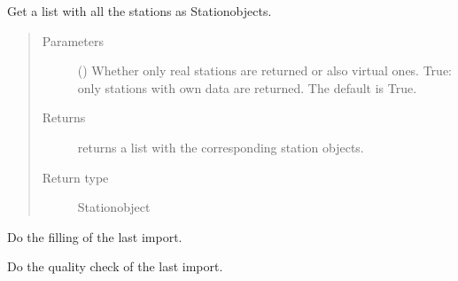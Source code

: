 \documentclass[letterpaper,10pt,english]{sphinxmanual}
\begin{document}
\begin{fulllineitems}

\begin{fulllineitems}
\label{\detokenize{weatherDB:weatherDB.stations.StationsBase.get_stations}}
\sphinxAtStartPar
Get a list with all the stations as Station\sphinxhyphen{}objects.
\begin{quote}\begin{description}
\item[{Parameters}] \leavevmode
\sphinxAtStartPar
{} (\sphinxstyleliteralemphasis{\sphinxupquote{, }}) \textendash{} Whether only real stations are returned or also virtual ones.
True: only stations with own data are returned.
The default is True.

\item[{Returns}] \leavevmode
\sphinxAtStartPar
returns a list with the corresponding station objects.

\item[{Return type}] \leavevmode
\sphinxAtStartPar
Station\sphinxhyphen{}object

\end{description}\end{quote}

\end{fulllineitems}


\begin{fulllineitems}
\label{\detokenize{weatherDB:weatherDB.stations.StationsBase.last_imp_fillup}}
\sphinxAtStartPar
Do the filling of the last import.

\end{fulllineitems}


\begin{fulllineitems}
\label{\detokenize{weatherDB:weatherDB.stations.StationsBase.last_imp_quality_check}}
\sphinxAtStartPar
Do the quality check of the last import.


\end{fulllineitems}
\end{fulllineitems}
\end{document}
